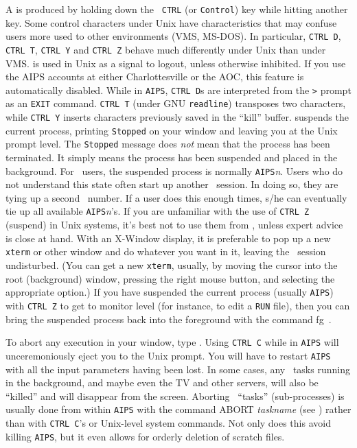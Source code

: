     A  is produced by holding down the {\tt
CTRL} (or {\tt Control}) key while hitting another key.  Some control
characters under Unix have characteristics that may confuse users more
used to other environments (VMS, MS-DOS).  In particular, {\tt CTRL
D}, {\tt CTRL T}, {\tt CTRL Y} and {\tt CTRL Z} behave much
differently under Unix than under VMS\@.  {\tt {}} is
used in Unix as a signal to logout, unless otherwise inhibited.  If
you use the AIPS accounts at either Charlottesville or the AOC, this
feature is automatically disabled.  While in {\tt AIPS}, {\tt CTRL D}s
are interpreted from the {\tt >} prompt as an {\tt EXIT} command.
{\tt CTRL T} (under GNU {\tt readline}) transposes two characters,
while {\tt CTRL Y} inserts characters previously saved in the ``kill''
buffer.  {\tt {}} suspends the current process, printing
{\tt Stopped} on your window and leaving you at the Unix prompt level.
The {\tt Stopped} message does {\it not\/} mean that the process has
been terminated.  It simply means the process has been suspended and
placed in the background.  For \AIPS\ users, the suspended process is
normally {\tt AIPS}{\it n\/}.  Users who do not understand this state
often start up another \AIPS\ session.  In doing so, they are tying up
a second \AIPS\ number.  If a user does this enough times, s/he can
eventually tie up all available {\tt AIPS}{\it n\/}'s.  If you are
unfamiliar with the use of {\tt CTRL Z} (suspend) in Unix systems,
it's best not to use them from \AIPS, unless expert advice is close at
hand.  With an X-Window display, it is preferable to pop up a new {\tt
xterm} or other window and do whatever you want in it, leaving the
\AIPS\ session undisturbed.  (You can get a new {\tt xterm}, usually,
by moving the cursor into the root (background) window, pressing the
right mouse button, and selecting the appropriate option.)  If you
have suspended the current process (usually {\tt AIPS}) with {\tt CTRL
Z} to get to monitor level (for instance, to edit a {\tt RUN} file),
then you can bring the suspended process back into the foreground with
the command \hbox{{\us fg \CR}}.

     To abort any execution in your window, type \hbox{{\tt {}}}.  Using {\tt CTRL C} while in {\tt AIPS} will unceremoniously
eject you to the Unix prompt.  You will have to restart {\tt AIPS}
with all the input parameters having been lost.  In some cases, any
\AIPS\ tasks running in the background, and maybe even the TV and
other servers, will also be ``killed'' and will disappear from the
screen.  Aborting \AIPS\ ``tasks'' (sub-processes) is usually done
from within {\tt AIPS} with the command {\us ABORT {\it taskname\/}
\CR} (see ) rather than with {\tt CTRL C}'s or Unix-level
system commands.  Not only does this avoid killing {\tt AIPS}, but it
even allows for orderly deletion of scratch files.

